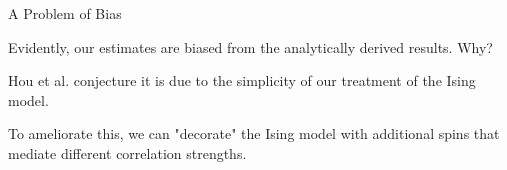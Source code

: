 \documentclass[aspectratio=169, 12pt]{beamer}
\begin{document}
\begin{frame}{A Problem of Bias}

    Evidently, our estimates are biased from the analytically derived results. 
    Why? 

    \vspace{1em}

    Hou et al. conjecture it is due to the simplicity of our treatment of the Ising model. 

    \vspace{1em}
    
    To ameliorate this, we can "decorate" the Ising model with additional spins that mediate different correlation strengths. 
    
\end{frame}
\end{document}
